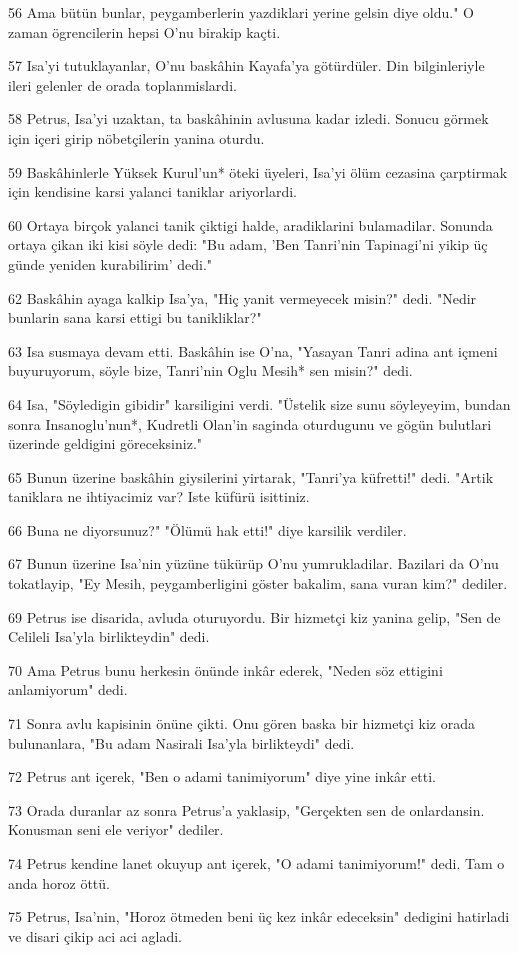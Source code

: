 \par 56 Ama bütün bunlar, peygamberlerin yazdiklari yerine gelsin diye oldu." O zaman ögrencilerin hepsi O'nu birakip kaçti.
\par 57 Isa'yi tutuklayanlar, O'nu baskâhin Kayafa'ya götürdüler. Din bilginleriyle ileri gelenler de orada toplanmislardi.
\par 58 Petrus, Isa'yi uzaktan, ta baskâhinin avlusuna kadar izledi. Sonucu görmek için içeri girip nöbetçilerin yanina oturdu.
\par 59 Baskâhinlerle Yüksek Kurul'un* öteki üyeleri, Isa'yi ölüm cezasina çarptirmak için kendisine karsi yalanci taniklar ariyorlardi.
\par 60 Ortaya birçok yalanci tanik çiktigi halde, aradiklarini bulamadilar. Sonunda ortaya çikan iki kisi söyle dedi: "Bu adam, 'Ben Tanri'nin Tapinagi'ni yikip üç günde yeniden kurabilirim' dedi."
\par 62 Baskâhin ayaga kalkip Isa'ya, "Hiç yanit vermeyecek misin?" dedi. "Nedir bunlarin sana karsi ettigi bu tanikliklar?"
\par 63 Isa susmaya devam etti. Baskâhin ise O'na, "Yasayan Tanri adina ant içmeni buyuruyorum, söyle bize, Tanri'nin Oglu Mesih* sen misin?" dedi.
\par 64 Isa, "Söyledigin gibidir" karsiligini verdi. "Üstelik size sunu söyleyeyim, bundan sonra Insanoglu'nun*, Kudretli Olan'in saginda oturdugunu ve gögün bulutlari üzerinde geldigini göreceksiniz."
\par 65 Bunun üzerine baskâhin giysilerini yirtarak, "Tanri'ya küfretti!" dedi. "Artik taniklara ne ihtiyacimiz var? Iste küfürü isittiniz.
\par 66 Buna ne diyorsunuz?" "Ölümü hak etti!" diye karsilik verdiler.
\par 67 Bunun üzerine Isa'nin yüzüne tükürüp O'nu yumrukladilar. Bazilari da O'nu tokatlayip, "Ey Mesih, peygamberligini göster bakalim, sana vuran kim?" dediler.
\par 69 Petrus ise disarida, avluda oturuyordu. Bir hizmetçi kiz yanina gelip, "Sen de Celileli Isa'yla birlikteydin" dedi.
\par 70 Ama Petrus bunu herkesin önünde inkâr ederek, "Neden söz ettigini anlamiyorum" dedi.
\par 71 Sonra avlu kapisinin önüne çikti. Onu gören baska bir hizmetçi kiz orada bulunanlara, "Bu adam Nasirali Isa'yla birlikteydi" dedi.
\par 72 Petrus ant içerek, "Ben o adami tanimiyorum" diye yine inkâr etti.
\par 73 Orada duranlar az sonra Petrus'a yaklasip, "Gerçekten sen de onlardansin. Konusman seni ele veriyor" dediler.
\par 74 Petrus kendine lanet okuyup ant içerek, "O adami tanimiyorum!" dedi. Tam o anda horoz öttü.
\par 75 Petrus, Isa'nin, "Horoz ötmeden beni üç kez inkâr edeceksin" dedigini hatirladi ve disari çikip aci aci agladi.

